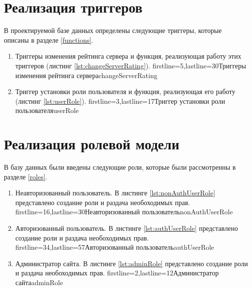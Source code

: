 \section{Реализация триггеров}

В проектируемой базе данных определены следующие триггеры, которые описаны в разделе \ref{functions}.

\begin{enumerate}
    \item Триггеры изменения рейтинга сервера и функция, реализующая работу этих триггеров (листинг \ref{lst:changeServerRating}).
            {firstline=5,lastline=30}{Триггеры изменения рейтинга сервера}{changeServerRating}{}

    \item Триггер установки роли пользователя и функция, реализующая его работу (листинг \ref{lst:userRole}).
            {firstline=3,lastline=17}{Триггер установки роли пользователя}{userRole}{}
\end{enumerate}


\section{Реализация ролевой модели}

В базу данных были введены следующие роли, которые были рассмотренны в разделе \ref{roles}.

\begin{enumerate}
    \item Неавторизованный пользователь. В листинге \ref{lst:nonAuthUserRole} представлено создание роли и раздача необоходимых прав.
            {firstline=16,lastline=30}{Неавторизованный пользователь}{nonAuthUserRole}{}

    \item Авторизованный пользователь. В листинге \ref{lst:authUserRole} представлено создание роли и раздача необоходимых прав.
            {firstline=34,lastline=57}{Авторизованный пользователь}{authUserRole}{}

    \item Администратор сайта. В листинге \ref{lst:adminRole} представлено создание роли и раздача необоходимых прав.
            {firstline=2,lastline=12}{Администратор сайта}{adminRole}{}
\end{enumerate}


